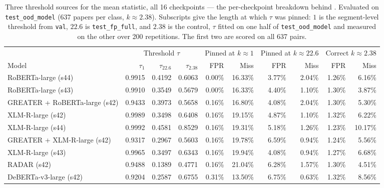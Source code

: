 \begin{table}[t]
\caption{Three threshold sources for the mean statistic, all 16 checkpoints ---
the per-checkpoint breakdown behind . Evaluated on
\texttt{test\_ood\_model} (637 papers per class, $k\approx2.38$). Subscripts give the
length at which $\tau$ was pinned: $1$ is the segment-level threshold from
\texttt{val}, $22.6$ is \texttt{test\_fp\_full}, and $2.38$ is the control, $\tau$
fitted on one half of \texttt{test\_ood\_model} and measured on the other over 200
repetitions. The first two are scored on all 637 pairs.}
\label{tab:ktransfer}
\centering
\footnotesize
\setlength{\tabcolsep}{4.5pt}
\begin{tabular}{@{}lrrrrrrrrr@{}}
\toprule
& \multicolumn{3}{c}{Threshold $\tau$} & \multicolumn{2}{c}{Pinned at $k{\approx}1$} & \multicolumn{2}{c}{Pinned at $k{\approx}22.6$} & \multicolumn{2}{c}{Correct $k{\approx}2.38$} \\
\cmidrule(lr){2-4}\cmidrule(lr){5-6}\cmidrule(lr){7-8}\cmidrule(lr){9-10}
Model & $\tau_{1}$ & $\tau_{22.6}$ & $\tau_{2.38}$ & FPR & Miss & FPR & Miss & FPR & Miss \\
\midrule
RoBERTa-large (s44) & 0.9915 & 0.4192 & 0.6063 & 0.00\% & 16.33\% & 3.77\% & 2.04\% & 1.26\% & 6.16\% \\
RoBERTa-large (s43) & 0.9910 & 0.3549 & 0.5679 & 0.00\% & 16.33\% & 4.40\% & 1.10\% & 1.30\% & 3.87\% \\
GREATER + RoBERTa-large (s42) & 0.9433 & 0.3973 & 0.5658 & 0.16\% & 16.80\% & 4.08\% & 2.04\% & 1.30\% & 5.30\% \\
XLM-R-large (s42) & 0.9989 & 0.3498 & 0.6408 & 0.16\% & 19.15\% & 4.87\% & 1.10\% & 1.32\% & 6.22\% \\
XLM-R-large (s44) & 0.9992 & 0.4581 & 0.8529 & 0.16\% & 19.31\% & 5.18\% & 1.26\% & 1.23\% & 10.17\% \\
GREATER + XLM-R-large (s42) & 0.9317 & 0.2967 & 0.5603 & 0.16\% & 19.78\% & 6.59\% & 0.94\% & 1.24\% & 5.56\% \\
XLM-R-large (s43) & 0.9965 & 0.3497 & 0.6343 & 0.16\% & 19.94\% & 4.08\% & 0.94\% & 1.27\% & 6.68\% \\
RADAR (s42) & 0.9488 & 0.1389 & 0.4771 & 0.16\% & 21.04\% & 6.28\% & 1.57\% & 1.30\% & 4.51\% \\
DeBERTa-v3-large (s42) & 0.9204 & 0.2587 & 0.6755 & 0.31\% & 13.50\% & 6.75\% & 0.63\% & 1.32\% & 8.56\% \\

\end{tabular}
\end{table}

